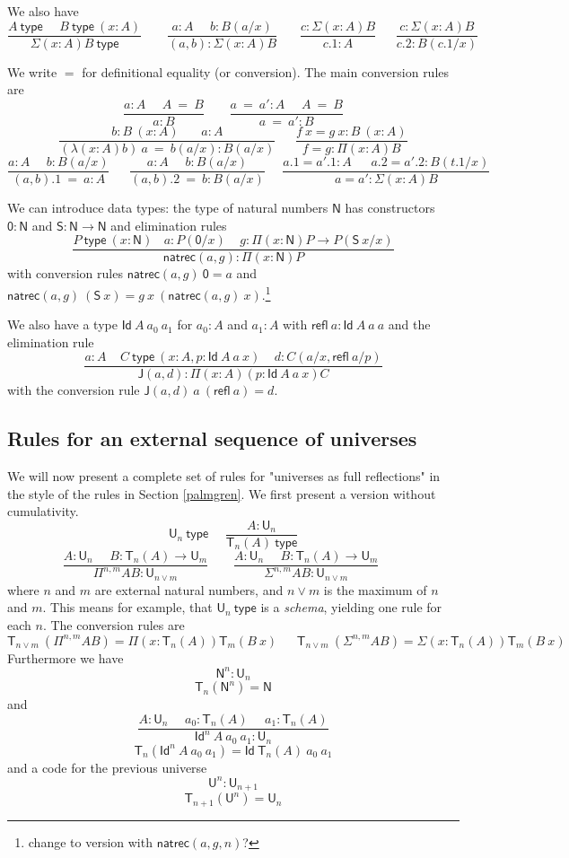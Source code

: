 \documentclass[11pt,a4paper]{article}
\newcommand{\refl}{\mathsf{refl}}
\newcommand{\Id}{\mathsf{Id}}
\newcommand{\conv}{=}
\def\NN{\mathsf{N}}
\def\UU{\mathsf{U}}
\def\JJ{\mathsf{J}}
\def\ZERO{\mathsf{0}}
\def\SUCC{\mathsf{S}}
\newcommand{\type}{\mathsf{type}}
\newcommand{\T}{\mathsf{T}}
\newcommand{\natrec}{\mathsf{natrec}}
\begin{document}
We also have
$$
\frac{A~\type~~~~~~B~\type~(x:A)}{\Sigma (x:A) B~\type}~~~~~~~~~
\frac{a:A~~~~~~b:B(a/x)}{(a,b):\Sigma (x:A) B}~~~~~~~~
\frac{c:\Sigma (x:A) B}{c.1:A}~~~~~~~
\frac{c:\Sigma (x:A) B}{c.2:B(c.1/x)}
$$

We write $\conv$ for definitional equality (or conversion). The main conversion rules are
$$
\frac{ a:A~~~~~~ A~ \conv~ B}{ a:B}~~~~~~~~~
\frac{ a ~\conv~a':A~~~~~~ A  ~\conv~ B}{ a ~\conv~a':B}
$$
$$
\frac{b:B~(x:A)~~~~~~~~ a:A}{ (\lambda (x:A)b)~a  ~\conv~ b(a/x):B(a/x)}
~~~~~~~
\frac{f~x = g~x:B~(x:A)}{ f = g : \Pi (x:A)B}
$$
$$
\frac{ a:A~~~~~~ b:B(a/x)}{ (a,b).1  ~\conv~ a:A}
~~~~~~~
\frac{ a:A~~~~~~ b:B(a/x)}{ (a,b).2  ~\conv~ b:B(a/x)}~~~~~~
\frac{ a.1 = a'.1:A~~~~~~~ a.2 = a'.2:B(t.1/x)}{ a = a' : \Sigma (x:A)B}
$$

We can introduce data types: the type of natural numbers $\NN$ has
constructors $\ZERO:\NN$ and $\SUCC:\NN\rightarrow\NN$ and elimination rules
$$
\frac{P~\type~(x:\NN)~~~~a:P(\ZERO/x)~~~~~g:\Pi (x:\NN)P\rightarrow P(\SUCC~x/x)}{\natrec(a,g):\Pi (x:\NN)P}
$$
with conversion rules $\natrec(a,g)~\ZERO = a$ and $\natrec(a,g)~(\SUCC~x) = g~x~(\natrec(a,g)~x)$.\footnote{change to version with $\natrec(a,g,n)$?}

We also have a type $\Id~A~a_0~a_1$ for $a_0:A$ and $a_1:A$ with $\refl~a:\Id~A~a~a$
and the elimination rule
$$\frac{a:A~~~~~C~\type~(x:A,p:\Id~A~a~x)~~~~~d:C(a/x,\refl~a/p)}{\JJ (a,d):\Pi (x:A)(p:\Id~A~a~x)C}$$
with the conversion rule $\JJ(a,d)~a~(\refl~a) = d$.

\subsection*{Rules for an external sequence of universes}

We will now present a complete set of rules for "universes as full reflections" in the style of the rules in Section \ref{palmgren}. We first present a version without cumulativity.
$$
\UU_n~\type~~~~~~
\frac{A:\UU_{n}}{\T_{n}(A)~\type}
$$
$$
\frac{A:\UU_{n}~~~~~~B:\T_{n}(A)\rightarrow \UU_{m}}
     {\Pi^{n,m} A B:\UU_{n\vee m}}~~~~~~~~~
\frac{A:\UU_{n}~~~~~~B:\T_{n}(A)\rightarrow \UU_{m}}
     {\Sigma^{n,m} A B:\UU_{n\vee m}}~~~~~~~~~
$$
where $n$ and $m$ are external natural numbers, and $n \vee m$ is the maximum of $n$ and $m$. This means for example, that $\UU_n~\type$ is a {\em schema}, yielding one rule for each $n$.
The conversion rules are
$$
\T_{n\vee m}~(\Pi^{n,m} A B) = \Pi (x:\T_{n}(A)) \T_{m}(B~x)~~~~~~~
\T_{n\vee m}~(\Sigma^{n,m} A B) = \Sigma (x:\T_{n}(A)) \T_{m}(B~x)~~~~~~~
$$
Furthermore we have $$\NN^{n}:\UU_{n}$$
$$\T_{n}(\NN^{n}) = \NN$$
and
$$
\frac{A:\UU_n~~~~~~a_0:\T_n(A)~~~~~~a_1:\T_n(A)}
{\Id^n~A~a_0~a_1:\UU_n}
$$
$$\T_n(\Id^n~A~a_0~a_1) = \Id~\T_n(A)~a_0~a_1$$
and a code for the previous universe
$${\UU^{n}}:\UU_{n + 1}$$
$$\T_{n + 1}({\UU^{n}}) = \UU_{n}$$
\end{document}
